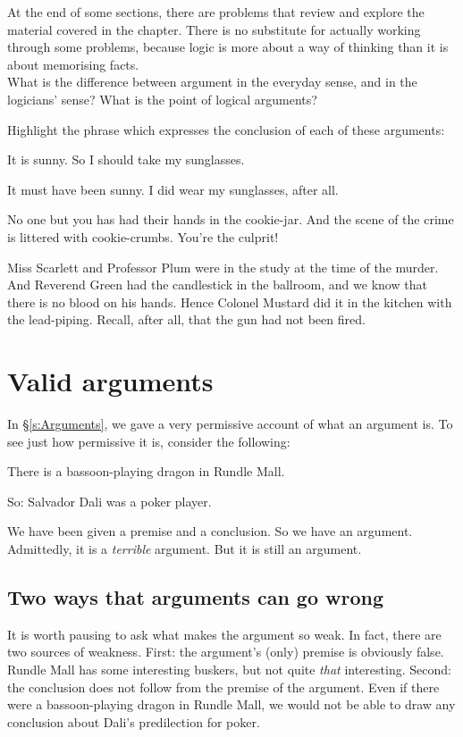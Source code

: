 \practiceproblems
At the end of some sections, there are problems that review and explore the material covered in the chapter. There is no substitute for actually working through some problems, because logic is more about a way of thinking than it is about memorising facts.\\[12pt]

\problempart What is the difference between argument in the everyday sense, and in the logicians’ sense? What is the point of logical arguments?

\problempart 
Highlight the phrase which expresses the conclusion of each of these arguments:
\begin{earg}
	\item It is sunny. So I should take my sunglasses.
	\item It must have been sunny. I did wear my sunglasses, after all.
	\item No one but you has had their hands in the cookie-jar. And the scene of the crime is littered with cookie-crumbs. You're the culprit!
	\item Miss Scarlett and Professor Plum were in the study at the time of the murder. And Reverend Green had the candlestick in the ballroom, and we know that there is no blood on his hands. Hence Colonel Mustard did it in the kitchen with the lead-piping. Recall, after all, that the gun had not been fired.
\end{earg}


\chapter{Valid arguments}\label{s:Valid}
In §\ref{s:Arguments}, we gave a very permissive account of what an argument is. To see just how permissive it is, consider the following:
	\begin{earg}
		\item[] There is a bassoon-playing dragon in Rundle Mall.
		\item[So:] Salvador Dali was a poker player.
	\end{earg}
We have been given a premise and a conclusion. So we have an argument. Admittedly, it is a \emph{terrible} argument. But it is still an argument.

\section{Two ways that arguments can go wrong}

It is worth pausing to ask what makes the argument so weak. In fact, there are two sources of weakness. First: the argument's (only) premise is obviously false. Rundle Mall has some interesting buskers, but not quite \emph{that} interesting. Second: the conclusion does not follow from the premise of the argument. Even if there were a bassoon-playing dragon in Rundle Mall, we would not be able to draw any conclusion about Dali's predilection for poker.

